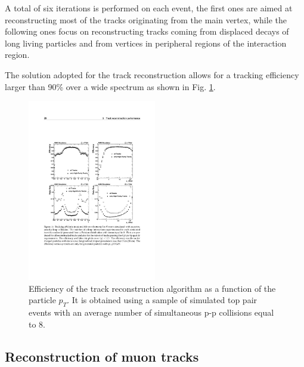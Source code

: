 A total of six iterations is performed on each event, the first ones are aimed at reconstructing most of the tracks originating from the main vertex, while the following ones focus on reconstructing tracks coming from displaced decays of long living particles and from vertices in peripheral regions of the interaction region.

The solution adopted for the track reconstruction allows for a tracking efficiency larger than 90\% over a wide \pT spectrum as shown in Fig. \ref{fig:tracking_eff}.

\begin{figure}[h!]
\begin{center}
\includegraphics[width=0.5\textwidth]{3_Evt_Reconstruction/pics/trackeff.pdf}
\caption{Efficiency of the track reconstruction algorithm as a function of the particle $p_T$. It is obtained using a sample of simulated top pair events with an average number of simultaneous p-p collisions equal to 8.  
\label{fig:tracking_eff}}
\end{center}
\end{figure}


\subsection{Reconstruction of muon tracks} 

